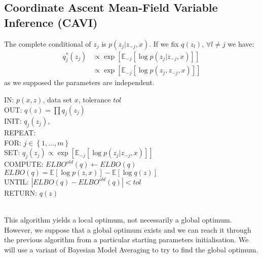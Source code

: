 \subsection{Coordinate Ascent Mean-Field Variable Inference (CAVI)}
The complete conditional of $z_j$ is $p(z_j|z_{-j},x)$. If we fix $q(z_l)$, $\forall l \neq j$ we have:
\begin{align}
q^*_j(z_j) &\propto \exp\left[\mathbb{E}_{-j}\left[\log p(z_j|z_{-j},x)\right]\right]\\
&\propto \exp\left[\mathbb{E}_{-j}\left[\log p(z_j,z_{-j},x)\right]\right]
\label{eq:CAVI}
\end{align}
as we supposed the parameters are independent.\\
\newline

\begin{text}
IN: $p(x,z)$, data set $x$, tolerance $tol$\\
OUT: $q(z) = \prod q_j(z_j)$\\
INIT: $q_j(z_j)$, \\
REPEAT:\\
	FOR: $j \in \left\lbrace1, \dots, m\right\rbrace$\\
		SET: $q_j(z_j) \propto \exp\left[\mathbb{E}_{-j}\left[\log p(z_j|z_{-j},x)\right]\right]$\\
	COMPUTE: $ELBO^{old}(q) \leftarrow ELBO(q)$\\
		$ELBO(q) = \mathbb{E}\left[\log p(z,x)\right] - \mathbb{E}\left[\log q(z) \right] $\\
UNTIL: $|ELBO(q)-ELBO^{old}(q)|<tol$\\
RETURN: $q(z)$
\end{text}
\\
\newline
This algorithm yields a local optimum, not necessarily a global optimum. However, we suppose that a global optimum exists and we can reach it through the previous algorithm from a particular starting parameters initialisation. We will use a variant of Bayesian Model Averaging to try to find the global optimum.